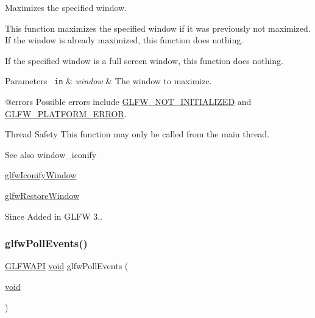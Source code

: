 Maximizes the specified window. 

This function maximizes the specified window if it was previously not maximized. If the window is already maximized, this function does nothing.

If the specified window is a full screen window, this function does nothing.


\begin{DoxyParams}[1]{Parameters}
\mbox{\texttt{ in}}  & {\em window} & The window to maximize.\\
\hline
\end{DoxyParams}
@errors Possible errors include \mbox{\hyperlink{group__errors_ga2374ee02c177f12e1fa76ff3ed15e14a}{G\+L\+F\+W\+\_\+\+N\+O\+T\+\_\+\+I\+N\+I\+T\+I\+A\+L\+I\+Z\+ED}} and \mbox{\hyperlink{group__errors_gad44162d78100ea5e87cdd38426b8c7a1}{G\+L\+F\+W\+\_\+\+P\+L\+A\+T\+F\+O\+R\+M\+\_\+\+E\+R\+R\+OR}}.

\begin{DoxyParagraph}{Thread Safety}
This function may only be called from the main thread.
\end{DoxyParagraph}
\begin{DoxySeeAlso}{See also}
window\+\_\+iconify 

\mbox{\hyperlink{group__window_ga24274e3c6ecd44e11fec5e6b66e4d7f3}{glfw\+Iconify\+Window}} 

\mbox{\hyperlink{group__window_ga1e29caf0b819f578b04db52fff17256c}{glfw\+Restore\+Window}}
\end{DoxySeeAlso}
\begin{DoxySince}{Since}
Added in G\+L\+FW 3.. 
\end{DoxySince}
\mbox{\label{group__window_ga872d16e4c77f58c0436f356255920cfc}} 
\subsubsection{\texorpdfstring{glfwPollEvents()}{glfwPollEvents()}}
{\footnotesize\ttfamily \mbox{\hyperlink{glfw3_8h_a56da5036b2cc259351ae22fd6439bb47}{G\+L\+F\+W\+A\+PI}} \mbox{\hyperlink{glad_8h_a950fc91edb4504f62f1c577bf4727c29}{void}} glfw\+Poll\+Events (\begin{DoxyParamCaption}\item[{\mbox{\hyperlink{glad_8h_a950fc91edb4504f62f1c577bf4727c29}{void}}}]{ }\end{DoxyParamCaption})}



